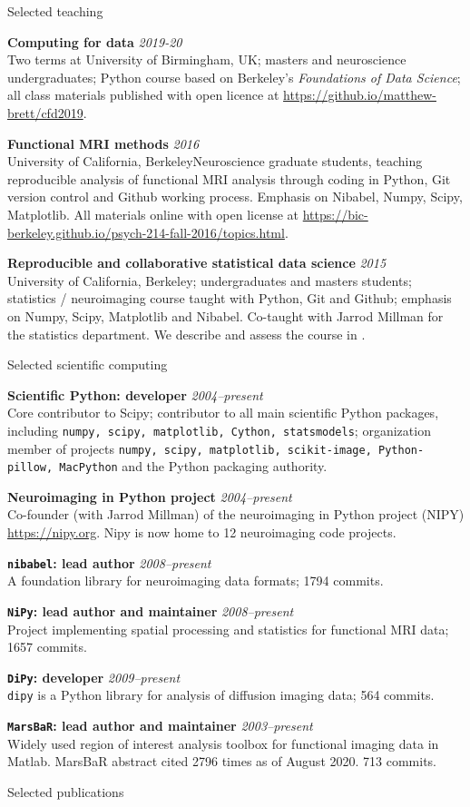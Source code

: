 \documentclass[11pt]{cv}
\newcommand{\PlaceDateNote}[3]{{\bf #1} \hfill {\em #2} \\#3}
\newcommand{\UoB}{University of Birmingham, UK}
\newcommand{\UCB}{University of California, Berkeley}
\newcommand{\Pkg}[1]{{\tt #1}}
\begin{document}
\begin{cvSection}{Selected teaching}

\PlaceDateNote{Computing for data}{2019-20}
    {Two terms at \UoB; masters and neuroscience undergraduates; Python course
    based on Berkeley's {\it Foundations of Data Science}; all class materials
    published with open licence at
    \url{https://github.io/matthew-brett/cfd2019}.}

\PlaceDateNote{Functional MRI methods}{2016}
    {\UCB Neuroscience graduate students, teaching reproducible analysis of
    functional MRI analysis through coding in Python, Git version control and
    Github working process. Emphasis on Nibabel, Numpy, Scipy, Matplotlib. All
    materials online with open license at
    \url{https://bic-berkeley.github.io/psych-214-fall-2016/topics.html}.}

\PlaceDateNote{Reproducible and collaborative statistical data science}{2015}
    {\UCB; undergraduates and masters students; statistics / neuroimaging
    course taught with Python, Git and Github; emphasis on Numpy, Scipy,
    Matplotlib and Nibabel. Co-taught with Jarrod Millman for the statistics
    department.  We describe and assess the course in
    \cite{millman2018rcsds}.}

\end{cvSection}

\begin{cvSection}{Selected scientific computing}

\PlaceDateNote{Scientific Python: developer}{2004--present}
{Core contributor to Scipy; contributor to all main scientific Python
    packages, including \Pkg{numpy, scipy, matplotlib, Cython, statsmodels};
    organization member of projects \Pkg{numpy, scipy, matplotlib,
    scikit-image, Python-pillow, MacPython} and the Python packaging
    authority.}

\PlaceDateNote{Neuroimaging in Python project}{2004--present}
{Co-founder (with Jarrod Millman) of the neuroimaging in Python project (NIPY)
    \url{https://nipy.org}.  Nipy is now home to 12 neuroimaging
    code projects.}

\PlaceDateNote{\Pkg{nibabel}: lead author}{2008--present}
    {A foundation library for neuroimaging data formats; 1794 commits.}

\PlaceDateNote{\Pkg{NiPy}: lead author and maintainer}{2008--present} {Project
    implementing spatial processing and statistics for functional MRI
    data; 1657 commits.}

\PlaceDateNote{\Pkg{DiPy}: developer}{2009--present}
    {\Pkg{dipy} is a Python library for
    analysis of diffusion imaging data; 564 commits.}

\PlaceDateNote{\Pkg{MarsBaR}: lead author and maintainer}{2003--present}
    {Widely used region of interest analysis toolbox for functional imaging
    data in Matlab.  MarsBaR abstract cited 2796 times as of August 2020. 713
    commits.}

\end{cvSection}

\begin{cvSection}{Selected publications}

\nocite{harris2020array,
    virtanen2020scipy,
    millman2018rcsds,
    garyfallidis2014dipy,
    Poline2012,
    Poldrack2008,
    Millman2007,
    Brett2007,
    Saxe2006,
    Brett2002}

\printbibliography[heading=none]

\end{cvSection}
\end{document}
